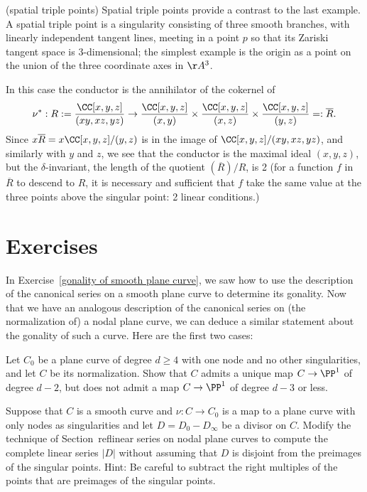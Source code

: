\begin{example} (spatial triple points) Spatial triple points provide a contrast to the last example. A spatial triple point is a singularity consisting of three smooth branches, with linearly independent tangent lines, meeting in a point $p$ so that its Zariski tangent space is 3-dimensional; the simplest example is the origin as a point on the union of the three coordinate axes in $\AA^3$.

In this case the conductor is the annihilator of the cokernel of
$$
\nu^{*}: R := \frac{\CC[x,y,z]}{(xy, xz, yz)} \to \frac{\CC[x,y,z]}{(x,y)} \times \frac{\CC[x,y,z]}{(x,z)} \times \frac{\CC[x,y,z]}{(y,z)} =: \overline R.
$$
Since $x\overline {R} = x \CC[x,y,z]/(y,z)$ is in the image of $\CC[x,y,z]/(xy, xz, yz)$, and similarly with $y$ and $z$,
we see that the conductor is the maximal ideal $(x,y,z)$, but the $\delta$-invariant, the length
of the quotient $(\overline R)/R$, is 2 (for a function $f$ in $\overline R$ to descend to $R$, it
is necessary and sufficient that $f$ take the same value at the three points above the singular point:
2 linear conditions.)
\end{example}

\section{Exercises}

In Exercise~\ref{gonality of smooth plane curve}, we saw how to use the description of the canonical series on a smooth plane curve to determine its gonality. Now that we have an analogous description of the canonical series on (the normalization of) a nodal plane curve, we can deduce a similar statement about the gonality of such a curve. Here are the first two cases: 

\begin{exercise}
Let $C_0$ be a plane curve of degree $d\geq 4$ with one node and no other singularities, and let $C$ be its normalization. Show that $C$ admits a unique map $C \to \PP^1$ of degree $d-2$, but does not admit a map $C \to \PP^1$ of degree $d-3$ or less.
\end{exercise}

\begin{exercise}\label{general case of divisors on nodal curves}
Suppose that $C$ is a smooth curve and $\nu: C \to C_0$ is a map to a plane curve with
only nodes as singularities and let $D = D_0-D_\infty$ be a divisor on $C$. Modify the 
technique of Section~ref{linear series on nodal plane curves} to compute the complete
linear series $|D|$ without assuming that $D$ is disjoint from the preimages of the singular
points. 
Hint: Be careful to subtract the right multiples of the points that are preimages of the singular
points.
\end{exercise}


